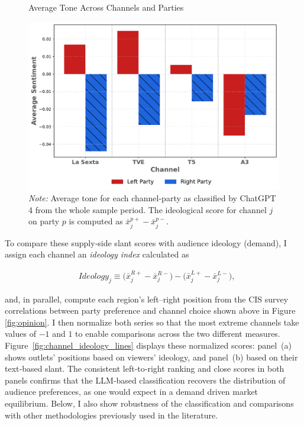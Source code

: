 \documentclass[12pt]{article}
\begin{document}
	
		\begin{figure}[!htbp]
		\caption{Average Tone Across Channels and Parties}
		\centering
		\includegraphics[width=120mm]{figures/chatgpt}
		\caption*{\small \textit{Note:} Average tone for each channel-party as classified by ChatGPT 4 from the whole sample period. The ideological score for channel $j$ on party  $p$ is computed as $	\bar{x}_j^{p+}-\bar{x}_j^{p-}$.}
		\label{fig:chat}
	\end{figure}
	
	
	
	
	To compare these supply‐side slant scores with audience ideology (demand), I assign each channel an \textit{ideology index} calculated as 
	
	
	
	\begin{equation}\label{eq:ideo_index}
		\begin{aligned}
			& Ideology_j \equiv \bigl(\bar{x}_j^{R+}-\bar{x}_j^{R-}\bigr)-\bigl(\bar{x}_j^{L+}-\bar{x}_j^{L-}\bigr),
		\end{aligned}
	\end{equation} 
	

and, in parallel, compute each region’s left–right position from the CIS survey correlations between party preference and channel choice shown above in Figure \ref{fig:opinion}. I then normalize both series so that the most extreme channels take values of $-1$ and $1$ to enable comparisons across the two different measures. Figure~\ref{fig:channel_ideology_lines} displays these normalized scores: panel~(a) shows outlets' positions based on viewers’ ideology, and panel~(b) based on their text‐based slant. The consistent left‐to‐right ranking and close scores in both panels confirms that the LLM‐based classification recovers the distribution of audience preferences, as one would expect in  a demand driven market equilibrium. Below, I also show robustness of the classification and comparisons with other methodologies previously used in the literature.
		
\end{document}

